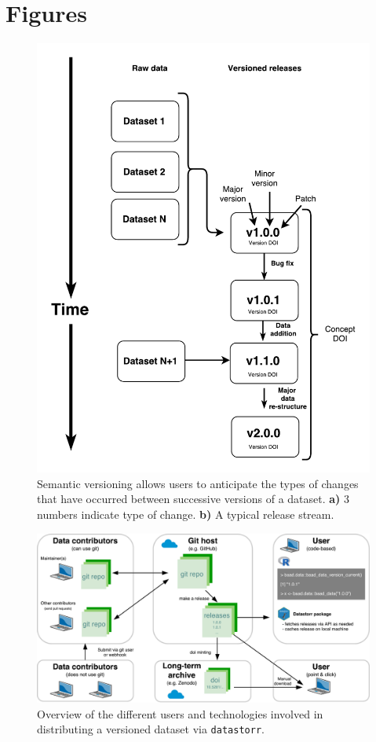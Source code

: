 \documentclass[a4paper,11pt]{article}
\begin{document}
\newpage

\section{Figures}

\begin{figure}[!hb]
\centering
\includegraphics[width=\linewidth]{figures/Figure1.pdf}
\caption{
Semantic versioning allows users to anticipate the types of changes that have occurred between successive versions of a dataset.
\textbf{a)} 3 numbers indicate type of change.
\textbf{b)} A typical release stream.}
\label{fig:semantic}
\end{figure}

\newpage


\begin{figure}[!hb]
\centering
\includegraphics[width=\linewidth]{figures/Figure2.pdf}
\caption{Overview of the different users and technologies involved in distributing a versioned dataset via \texttt{datastorr}.}
\label{fig:technology_stack}
\end{figure}

\clearpage


\end{document}
